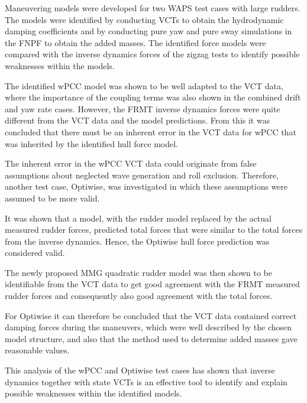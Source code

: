 %
\noindent Maneuvering models were developed for two WAPS test cases with large rudders. The models were identified by conducting VCTs to obtain the hydrodynamic damping coefficients and by conducting pure yaw and pure sway simulations in the FNPF to obtain the added masses. The identified force models were compared with the inverse dynamics forces of the zigzag tests to identify possible weaknesses within the models.  

The identified wPCC model was shown to be well adapted to the VCT data, where the importance of the coupling terms was also shown in the combined drift and yaw rate cases.
However, the FRMT inverse dynamics forces were quite different from the VCT data and the model predictions. From this it was concluded that there must be an inherent error in the VCT data for wPCC that was inherited by the identified hull force model.

The inherent error in the wPCC VCT data could originate from false assumptions about neglected wave generation and roll exclusion. Therefore, another test case, Optiwise, was investigated in which these assumptions were assumed to be more valid.

It was shown that a model, with the rudder model replaced by the actual measured rudder forces, predicted total forces that were similar to the total forces from the inverse dynamics. Hence, the Optiwise hull force prediction was considered valid.

The newly proposed MMG quadratic rudder model was then shown to be identifiable from the VCT data to get good agreement with the FRMT measured rudder forces and consequently also good agreement with the total forces. 

For Optiwise it can therefore be concluded that the VCT data contained correct damping forces during the maneuvers, which were well described by the chosen model structure, and also that the method used to determine added masses gave reasonable values. 

This analysis of the wPCC and Optiwise test cases has shown that inverse dynamics together with state VCTs is an effective tool to identify and explain possible weaknesses within the identified models.

